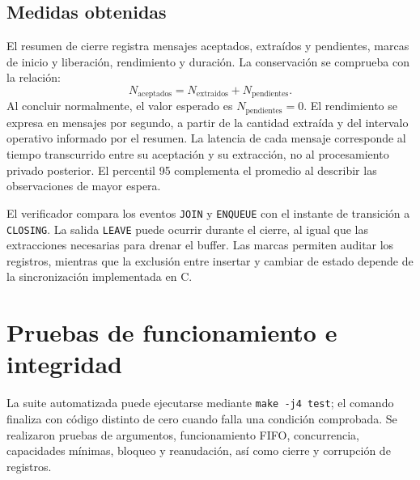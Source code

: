 \documentclass[conference]{IEEEtran}
\begin{document}
\subsection{Medidas obtenidas}
El resumen de cierre registra mensajes aceptados, extraídos y pendientes, marcas de inicio y liberación, rendimiento y duración. La conservación se comprueba con la relación:
\begin{equation}
N_{\mathrm{aceptados}}=N_{\mathrm{extraidos}}+N_{\mathrm{pendientes}}.
\end{equation}
Al concluir normalmente, el valor esperado es \(N_{\mathrm{pendientes}}=0\). El rendimiento se expresa en mensajes por segundo, a partir de la cantidad extraída y del intervalo operativo informado por el resumen. La latencia de cada mensaje corresponde al tiempo transcurrido entre su aceptación y su extracción, no al procesamiento privado posterior. El percentil 95 complementa el promedio al describir las observaciones de mayor espera.

El verificador compara los eventos \texttt{JOIN} y \texttt{ENQUEUE} con el instante de transición a \texttt{CLOSING}. La salida \texttt{LEAVE} puede ocurrir durante el cierre, al igual que las extracciones necesarias para drenar el buffer. Las marcas permiten auditar los registros, mientras que la exclusión entre insertar y cambiar de estado depende de la sincronización implementada en C.

\section{Pruebas de funcionamiento e integridad}
La suite automatizada puede ejecutarse mediante \texttt{make -j4 test}; el comando finaliza con código distinto de cero cuando falla una condición comprobada. Se realizaron pruebas de argumentos, funcionamiento FIFO, concurrencia, capacidades mínimas, bloqueo y reanudación, así como cierre y corrupción de registros.
\end{document}

